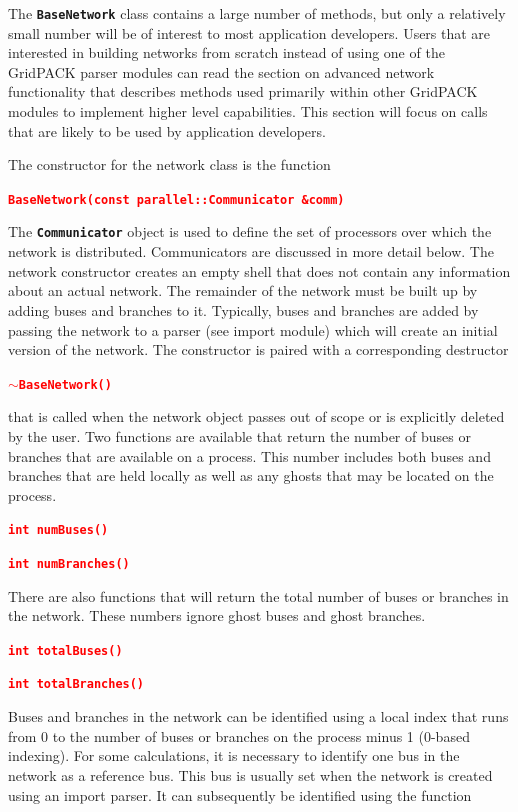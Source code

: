 \documentclass[12pt]{report} %
\begin{document}
The \texttt{\textbf{BaseNetwork}} class contains a large number of methods, but only a relatively small number will be of interest to most application developers. Users that are interested in building networks from scratch instead of using one of the GridPACK parser modules can read the section on advanced network functionality that describes methods used primarily within other GridPACK modules to implement higher level capabilities. This section will focus on calls that are likely to be used by application developers.

The constructor for the network class is the function

\textcolor{red}{\texttt{\textbf{BaseNetwork(const parallel::Communicator \&comm)}}}

The \texttt{\textbf{Communicator}} object is used to define the set of processors over which the network is distributed. Communicators are discussed in more detail below. The network constructor creates an empty shell that does not contain any information about an actual network. The remainder of the network must be built up by adding buses and branches to it. Typically, buses and branches are added by passing the network to a parser (see import module) which will create an initial version of the network. The constructor is paired with a corresponding destructor

\textcolor{red}{\texttt{\textbf{$\boldsymbol{\mathrm{\sim}}$BaseNetwork()}}} 

that is called when the network object passes out of scope or is explicitly deleted by the user.
Two functions are available that return the number of buses or branches that are available on a process. This number includes both buses and branches that are held locally as well as any ghosts that may be located on the process.

\textcolor{red}{\texttt{\textbf{int numBuses()}}}
\textcolor{red}{\texttt{\textbf{}}}

\textcolor{red}{\texttt{\textbf{int numBranches()}}}

There are also functions that will return the total number of buses or branches in the network. These numbers ignore ghost buses and ghost branches.

\textcolor{red}{\texttt{\textbf{int totalBuses()}}}
\textcolor{red}{\texttt{\textbf{}}}

\textcolor{red}{\texttt{\textbf{int totalBranches()}}}

Buses and branches in the network can be identified using a local index that runs from 0 to the number of buses or branches on the process minus 1 (0-based indexing). For some calculations, it is necessary to identify one bus in the network as a reference bus. This bus is usually set when the network is created using an import parser. It can subsequently be identified using the function
\end{document}
